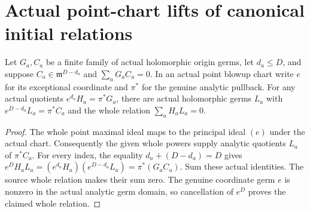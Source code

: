 \section{Actual point-chart lifts of canonical initial relations}

\begin{lemma}
\label{hir:actual-analytic-normalized-weighted-syzygy}
\leanok
Let $G_a,C_a$ be a finite family of actual holomorphic origin germs,
let $d_a\le D$, and suppose $C_a\in\mathfrak m^{D-d_a}$ and $\sum_a G_aC_a=0$.
In an actual point blowup chart write $e$ for its exceptional coordinate
and $\pi^*$ for the genuine analytic pullback. For any actual quotients
$e^{d_a}H_a=\pi^*G_a$, there are actual holomorphic germs $L_a$
with $e^{D-d_a}L_a=\pi^*C_a$ and the whole relation
$\sum_a H_aL_a=0$.
\end{lemma}
\begin{proof}
The whole point maximal ideal maps to the principal ideal $(e)$ under
the actual chart. Consequently the given whole powers supply analytic
quotients $L_a$ of $\pi^*C_a$. For every index, the equality
$d_a+(D-d_a)=D$ gives
$e^D H_aL_a=(e^{d_a}H_a)(e^{D-d_a}L_a)=\pi^*(G_aC_a)$.
Sum these actual identities. The source whole relation makes their sum
zero. The genuine coordinate germ $e$ is nonzero in the actual analytic
germ domain, so cancellation of $e^D$ proves the claimed whole relation.
\end{proof}

